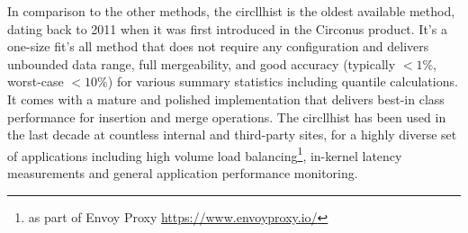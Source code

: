 \documentclass{article}
\theoremstyle{plain}
\theoremstyle{remark}
\begin{document}
In comparison to the other methods, the circllhist is the oldest available method, dating back to
2011 when it was first introduced in the Circonus product. It's a one-size fit's all method that
does not require any configuration and delivers unbounded data range, full mergeability, and good
accuracy (typically $<1\%$, worst-case $<10\%$) for various summary statistics including quantile
calculations. It comes with a mature and polished implementation that delivers best-in class
performance for insertion and merge operations. The circllhist has been used in the last decade at
countless internal and third-party sites, for a highly diverse set of applications including high
volume load balancing\footnote{as part of Envoy Proxy \url{https://www.envoyproxy.io/}}, in-kernel
latency measurements\cite{HHBPF} and general application performance monitoring.
\end{document}
